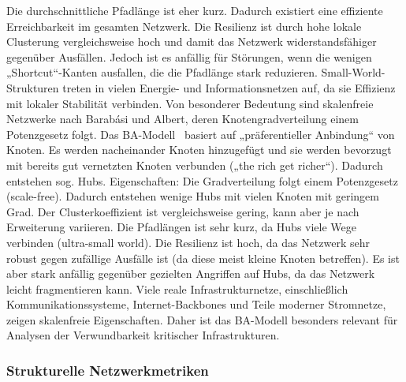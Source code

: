 \documentclass[14pt,a4paper]{scrartcl}
\begin{document}
	Die durchschnittliche Pfadlänge ist eher kurz. Dadurch existiert eine effiziente Erreichbarkeit im gesamten Netzwerk.
	Die Resilienz ist durch hohe lokale Clusterung vergleichsweise hoch und damit das Netzwerk widerstandsfähiger gegenüber Ausfällen. Jedoch ist es anfällig für Störungen, wenn die wenigen „Shortcut“-Kanten ausfallen, die die Pfadlänge stark reduzieren.
Small-World-Strukturen treten in vielen Energie- und Informationsnetzen auf, da sie Effizienz mit lokaler Stabilität verbinden.
Von besonderer Bedeutung sind skalenfreie Netzwerke nach Barabási und Albert, deren Knotengradverteilung einem Potenzgesetz folgt. Das BA-Modell~\cite{Albert2000ErrorAttack} basiert auf „präferentieller Anbindung“ von Knoten. Es werden nacheinander Knoten hinzugefügt und sie werden bevorzugt mit bereits gut vernetzten Knoten verbunden („the rich get richer“). Dadurch entstehen sog. Hubs.
Eigenschaften:
	Die Gradverteilung folgt einem Potenzgesetz (scale-free). Dadurch entstehen wenige Hubs mit vielen Knoten mit geringem Grad.
	Der Clusterkoeffizient ist vergleichsweise gering, kann aber je nach Erweiterung variieren.
	Die Pfadlängen ist sehr kurz, da Hubs viele Wege verbinden (ultra-small world).
	Die Resilienz ist hoch, da das Netzwerk sehr robust gegen zufällige Ausfälle ist (da diese meist kleine Knoten betreffen). Es ist aber stark anfällig gegenüber gezielten Angriffen auf Hubs, da das Netzwerk leicht fragmentieren kann.
Viele reale Infrastrukturnetze, einschließlich Kommunikationssysteme, Internet-Backbones und Teile moderner Stromnetze, zeigen skalenfreie Eigenschaften. Daher ist das BA-Modell besonders relevant für Analysen der Verwundbarkeit kritischer Infrastrukturen.

\subsubsection{Strukturelle Netzwerkmetriken}
\end{document}
